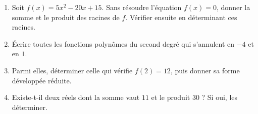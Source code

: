 

\begin{enumerate}
  \item Soit $f(x) = 5x^2 - 20x + 15$. Sans résoudre l'équation $f(x) = 0$,
        donner la somme et le produit des racines de $f$. Vérifier ensuite en
        déterminant ces racines.

  \item Écrire toutes les fonctions polynômes du second degré qui s'annulent
        en $-4$ et en $1$.

  \item Parmi elles, déterminer celle qui vérifie $f(2) = 12$, puis donner sa
        forme développée réduite.

  \item Existe-t-il deux réels dont la somme vaut $11$ et le produit $30$ ?
        Si oui, les déterminer.
\end{enumerate}
